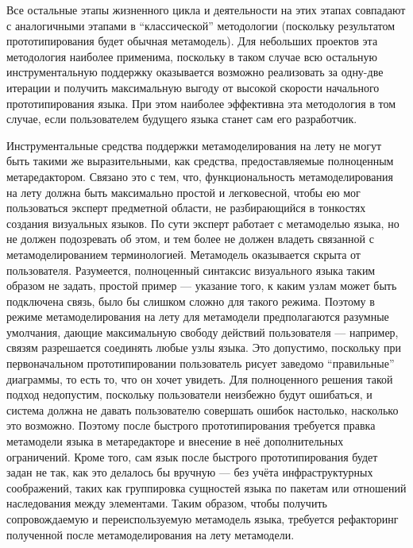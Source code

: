 Все остальные этапы жизненного цикла и деятельности на этих этапах совпадают с аналогичными 
этапами в "`классической"' методологии (поскольку результатом прототипирования будет 
обычная метамодель). Для небольших проектов эта методология наиболее применима, поскольку 
в таком случае всю остальную инструментальную поддержку оказывается возможно реализовать 
за одну-две итерации и получить максимальную выгоду от высокой скорости начального 
прототипирования языка. При этом наиболее эффективна эта методология в том случае, 
если пользователем будущего языка станет сам его разработчик.

Инструментальные средства поддержки метамоделирования на лету не могут быть такими же 
выразительными, как средства, предоставляемые полноценным метаредактором. Связано 
это с тем, что, функциональность метамоделирования на лету должна быть максимально 
простой и легковесной, чтобы ею мог пользоваться эксперт предметной области, не разбирающийся 
в тонкостях создания визуальных языков. По сути эксперт работает с метамоделью языка, 
но не должен подозревать об этом, и тем более не должен владеть связанной с метамоделированием 
терминологией. Метамодель оказывается скрыта от пользователя. Разумеется, полноценный 
синтаксис визуального языка таким образом не задать, простой пример --- указание того, 
к каким узлам может быть подключена связь, было бы слишком сложно для такого режима. 
Поэтому в режиме метамоделирования на лету для метамодели предполагаются разумные умолчания, 
дающие максимальную свободу действий пользователя --- например, связям разрешается соединять 
любые узлы языка. Это допустимо, поскольку при первоначальном прототипировании пользователь 
рисует заведомо "`правильные"' диаграммы, то есть то, что он хочет увидеть. Для полноценного 
решения такой подход недопустим, поскольку пользователи неизбежно будут ошибаться, и 
система должна не давать пользователю совершать ошибок настолько, насколько это возможно. 
Поэтому после быстрого прототипирования требуется правка метамодели языка в метаредакторе 
и внесение в неё дополнительных ограничений. Кроме того, сам язык после быстрого прототипирования 
будет задан не так, как это делалось бы вручную --- без учёта инфраструктурных соображений, 
таких как группировка сущностей языка по пакетам или отношений наследования между элементами. 
Таким образом, чтобы получить сопровождаемую и переиспользуемую метамодель языка, требуется 
рефакторинг полученной после метамоделирования на лету метамодели.

